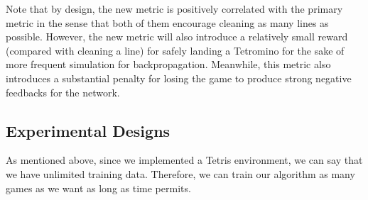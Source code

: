 \documentclass[letterpaper]{article} %
\begin{document}
Note that by design, the new metric is positively correlated with the primary metric in the sense that both of them encourage cleaning as many lines as possible. However, the new metric will also introduce a relatively small reward (compared with cleaning a line) for safely landing a Tetromino for the sake of more frequent simulation for backpropagation. Meanwhile, this metric also introduces a substantial penalty for losing the game to produce strong negative feedbacks for the network.

\subsection{Experimental Designs}

As mentioned above, since we implemented a Tetris environment, we can say that we have unlimited training data. Therefore, we can train our algorithm as many games as we want as long as time permits. 
\end{document}

